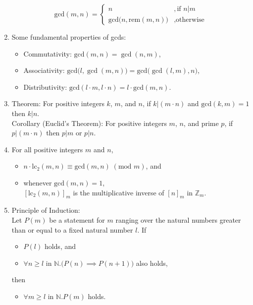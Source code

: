 \documentclass{article}
\begin{document}
\begin{enumerate}
        $$\text{gcd}(m,n)=\begin{cases}
            n &, \text{if }n|m\\
            \text{gcd}\big(n,\text{rem}(m,n)\big) &, \text{otherwise}
        \end{cases}$$
    \item Some fundamental properties of gcds:
        \begin{itemize}[topsep=0pt]
            \item Commutativity: $\text{gcd}(m,n)=\gcd(n,m)$,
            \item Associativity: $\text{gcd}\big(l,\gcd(m,n)\big)=\text{gcd}\big(\gcd(l,m),n\big)$,
            \item Distributivity: $\text{gcd}(l\cdot m,l\cdot n)=l\cdot\text{gcd}(m,n)$.
        \end{itemize}
    \item Theorem: For positive integers $k$, $m$, and $n$, if $k|(m\cdot n)$ and $\text{gcd}(k,m)=1$ then $k|n$.\\
        Corollary (Euclid's Theorem): For positive integers $m$, $n$, and prime $p$, if $p|(m\cdot n)$ then $p|m$ or $p|n$.
    \item For all positive integers $m$ and $n$,
        \begin{itemize}[topsep=0pt]
            \item $n\cdot\text{lc}_2(m,n)\equiv\text{gcd}(m,n)\;(\text{mod }m)$, and
            \item whenever $\text{gcd}(m,n)=1$,\\
                $[\text{lc}_2(m,n)]_m$ is the multiplicative inverse of $[n]_m$ in $\mathbb{Z}_m$.
        \end{itemize}
\newpage
    \item Principle of Induction:\\
        Let $P(m)$ be a statement for $m$ ranging over the natural numbers greater than or equal to a fixed natural number $l$. If 
        \begin{itemize}[topsep=0pt]
            \item $P(l)$ holds, and 
            \item $\forall n\geq l\text{ in }\mathbb{N}.\big(P(n)\implies P(n+1)\big)$ also holds,
        \end{itemize}
        then
        \begin{itemize}[topsep=0pt]
            \item $\forall m\geq l\text{ in }\mathbb{N}.P(m)$ holds.
        \end{itemize}

\end{enumerate}
\end{document}
